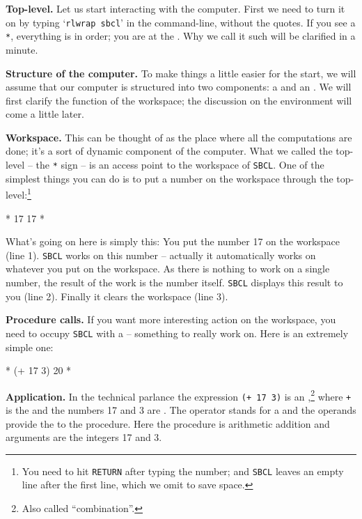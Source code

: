 \documentclass[a4paper,11pt]{article}
\begin{document}
\begin{uenum}
\item {\bf Top-level.} Let us start interacting with the computer. First we need to turn it on by typing `\Verb+rlwrap sbcl+' in the command-line, without the quotes. If you see a \Verb+*+, everything is in order; you are at the . Why we call it such will be clarified in a minute.

\item {\bf Structure of the computer.} To make things a little easier for the start, we will assume that our computer is structured into two components: a  and an . We will first clarify the function of the workspace; the discussion on the environment will come a little later. 

\item {\bf Workspace.} This can be thought of as the place where all the computations are done; it's a sort of dynamic component of the computer. What we called the top-level -- the \Verb+*+ sign -- is an access point to the workspace of \Verb+SBCL+. One of the simplest things you can do is to put a number on the workspace through the top-level:\footnote{You need to hit \Verb+RETURN+ after typing the number; and \Verb+SBCL+ leaves an empty line after the first line, which we omit to save space.} 

\begin{lispcode}
* 17
17
*
\end{lispcode}

What's going on here is simply this: You put the number 17 on the workspace (line 1). \Verb+SBCL+ works on this number -- actually it automatically works on whatever you put on the workspace. As there is nothing to work on a single number, the result of the work is the number itself. \Verb+SBCL+ displays this result to you (line 2). Finally it clears the workspace (line 3).

\item {\bf Procedure calls.} If you want more interesting action on the workspace, you need to occupy \Verb+SBCL+ with a  -- something to really work on. Here is an extremely simple one:

\begin{lispcode}
* (+ 17 3)
20
*
\end{lispcode}

\item {\bf Application.} In the technical parlance the expression \Verb-(+ 17 3)- is an ,\footnote{Also called ``combination''.} where \Verb-+- is the  and the numbers 17 and 3 are . The operator stands for a  and the operands provide the  to the procedure. Here the procedure is arithmetic addition and arguments are the integers 17 and 3.


\end{uenum}
\end{document}
